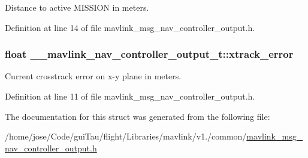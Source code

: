 Distance to active M\-I\-S\-S\-I\-O\-N in meters. 



Definition at line 14 of file mavlink\-\_\-msg\-\_\-nav\-\_\-controller\-\_\-output.\-h.

\hypertarget{struct____mavlink__nav__controller__output__t_a98cf3736cfd6f54d24effedb10b39cd0}{
\subsubsection[{xtrack\-\_\-error}]{\setlength{\rightskip}{0pt plus 5cm}float \-\_\-\-\_\-mavlink\-\_\-nav\-\_\-controller\-\_\-output\-\_\-t\-::xtrack\-\_\-error}}\label{struct____mavlink__nav__controller__output__t_a98cf3736cfd6f54d24effedb10b39cd0}


Current crosstrack error on x-\/y plane in meters. 



Definition at line 11 of file mavlink\-\_\-msg\-\_\-nav\-\_\-controller\-\_\-output.\-h.



The documentation for this struct was generated from the following file\-:\begin{DoxyCompactItemize}
\item 
/home/jose/\-Code/gui\-Tau/flight/\-Libraries/mavlink/v1./common/\hyperlink{mavlink__msg__nav__controller__output_8h}{mavlink\-\_\-msg\-\_\-nav\-\_\-controller\-\_\-output.\-h}\end{DoxyCompactItemize}
